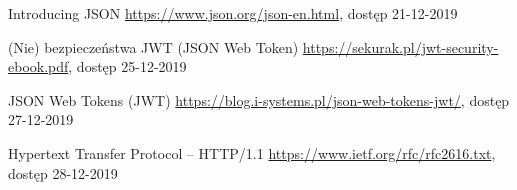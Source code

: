 \documentclass[12pt]{article}
\numberwithin{figure}{section}
\begin{document}
\begin{thebibliography}{99}
    Introducing JSON
    \url{https://www.json.org/json-en.html}, dostęp 21-12-2019
    
    (Nie) bezpieczeństwa JWT (JSON Web Token)
    \url{https://sekurak.pl/jwt-security-ebook.pdf}, dostęp 25-12-2019
    
    JSON Web Tokens (JWT)
    \url{https://blog.i-systems.pl/json-web-tokens-jwt/}, dostęp 27-12-2019
    
    Hypertext Transfer Protocol -- HTTP/1.1
    \url{https://www.ietf.org/rfc/rfc2616.txt}, dostęp 28-12-2019
    
    \end{thebibliography}
\end{document}
